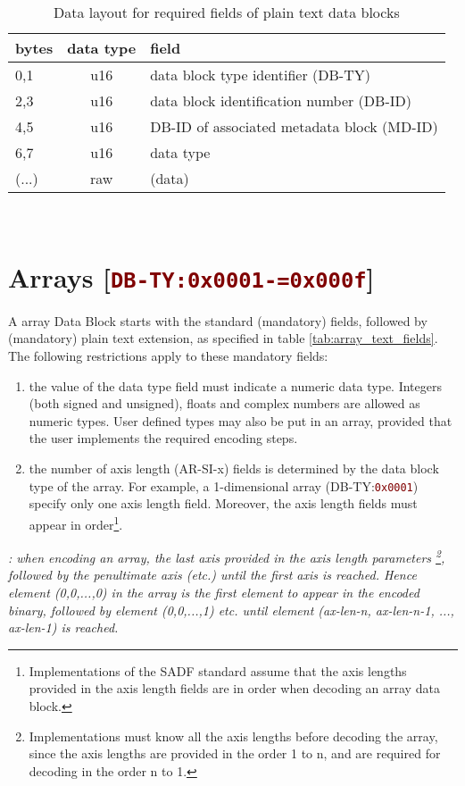 \documentclass[pagesize=a4]{tufte-book}
\newcommand{\hlred}[1]{\textcolor{Maroon}{#1}}%
\newcommand{\hex}[1]{\hlred{\texttt{#1}}}%
\begin{document}
\begin{table}[ht]
	\centering
	\selectfont
	\begin{tabular}{lcl}
		\toprule
		bytes & data type & field\\
		\midrule
		0,1 & u16 & data block type identifier (DB-TY)\\
		2,3 & u16 & data block identification number (DB-ID)\\
		4,5 & u16 & DB-ID of associated metadata block (MD-ID)\\
		6,7 & u16 & data type\\
 		(...) & raw & (data)\\
		\bottomrule
	\end{tabular}
	~\label{tab:plain_text_fields}
	\caption{Data layout for required fields of plain text data blocks}	
\end{table}
\vspace{5mm}

\section{Arrays [\hex{DB-TY:0x0001-=0x000f}]}
\label{DBTY:0x000x}
A array Data Block starts with the standard (mandatory) fields, followed by (mandatory) plain text extension, as specified in table \ref{tab:array_text_fields}. The following restrictions apply to these mandatory fields:
\begin{enumerate}
	\item the value of the data type field must indicate a numeric data type. Integers (both signed and unsigned), floats and complex numbers are allowed as numeric types. User defined types may also be put in an array, provided that the user implements the required encoding steps.
	\item the number of axis length (AR-SI-x) fields is determined by the data block type of the array. For example, a 1-dimensional array (DB-TY:\hex{0x0001})  specify only one axis length field. Moreover, the axis length fields must appear in order\footnote{Implementations of the SADF standard  assume that the axis lengths provided in the axis length fields are in order when decoding an array data block.}. 
\end{enumerate}
\emph{: when encoding an array, the last axis provided in the axis length parameters \footnote{Implementations must know all the axis lengths before decoding the array, since the axis lengths are provided in the order 1 to n, and are required for decoding in the order n to 1.}, followed by the penultimate axis (etc.) until the first axis is reached. Hence element (0,0,...,0) in the array is the first element to appear in the encoded binary, followed by element (0,0,...,1) etc. until element (ax-len-n, ax-len-n-1, ..., ax-len-1) is reached.}
\end{document}
